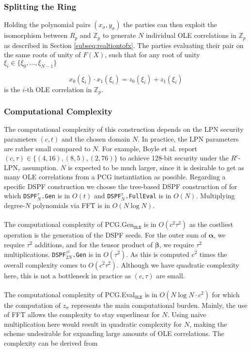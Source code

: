 \subsubsection{Splitting the Ring}

Holding the polynomial pairs $(x_\sigma , y_\sigma)$ the parties can then exploit the isomorphism between $R_p$ and $\mathbb{Z}_{p}$ to generate $N$ individual OLE correlations in $\mathbb{Z}_{p}$ as described in Section \ref{subseq:realtiontofx}. The parties evaluating their pair on the same roots of unity of $F(X)$, such that for any root of unity $\xi_i \in \{\xi_0, ...,\xi_{N-1}\}$

\begin{equation}
x_0(\xi_i) \cdot x_1(\xi_i) = z_0(\xi_i)+ z_1(\xi_i)
\end{equation}
is the $i$-th OLE correlation in $\mathbb{Z}_{p}$.

\subsubsection{Computational Complexity}
The computational complexity of this construction depends on the LPN security parameters $(c, t)$ and the chosen domain $N$. In practice, the LPN parameters are rather small compared to $N$. For example, Boyle et al. \cite{boyle2020efficient} report $(c,\tau) \in \{(4,16),(8,5),(2,76)\}$ to achieve 128-bit security under the $R^c$-LPN$_\tau$ assumption. $N$ is expected to be much larger, since it is desirable to get as many OLE correlations from a PCG instantiation as possible. Regarding a specific DSPF construction we choose the tree-based DSPF construction of \cite{boyle2016function} for which \texttt{DSPF$^{\tau}_{N}$.Gen} is in $O(t)$ and \texttt{DSPF$^{\tau}_{N}$.FullEval} is in $O(N)$. Multiplying degree-$N$ polynomials via FFT is in $O(N\log N)$.
\\\\
The computational complexity of PCG.Gen$_{\texttt{OLE}}$ is in $O(c^2\tau^2)$ as the costliest operation is the generation of the DSPF seeds. For the outer sum of $\boldsymbol{\alpha}$, we require $\tau^2$ additions, and for the tensor product of $\boldsymbol{\beta}$, we require $\tau^2$ multiplications. \texttt{DSPF$^{\tau^2}_{2N}$.Gen} is in $O(\tau^2)$. As this is computed $c^2$ times the overall complexity comes to $O(c^2\tau^2)$. Although we have quadratic complexity here, this is not a bottleneck in practice as $(c,\tau)$ are small.
\\\\
The computational complexity of PCG.Eval$_{\texttt{OLE}}$ is in $O(N\log N \cdot c^2)$ for which the computation of $z_\sigma$ represents the main computational burden. Mainly, the use of FFT allows the complexity to stay superlinear for $N$. Using naive multiplication here would result in quadratic complexity for $N$, making the scheme undesirable for expanding large amounts of OLE correlations. The complexity can be derived from

